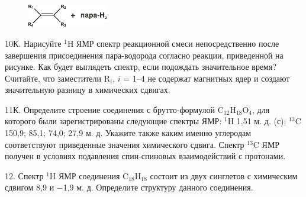 \begin{figure} %
    \centering
    \vspace{-3mm}
    \includegraphics[width=35mm]{images/Fig_2_9_10.png}
    \vspace{-4mm}
\end{figure}
10К. Нарисуйте $^1\text{H}$ ЯМР спектр реакционной смеси непосредственно после завершения присоединения пара-водорода согласно реакции, приведенной на рисунке. Как будет выглядеть спектр, если подождать значительное время? Считайте, что заместители $\text{R}_i$, $i$ = 1–4 не содержат магнитных ядер и создают значительную разницу в химических сдвигах.
\par
11К. Определите строение соединения с брутто-формулой $\text{C}_{12}\text{H}_{18}\text{O}_{4}$, для которого были зарегистрированы следующие спектры ЯМР: $^1\text{H}$ 1,51 м. д. (с); $^{13}\text{C}$ 150,9; 85,1; 74,0; 27,9 м. д. Укажите также каким именно углеродам соответствуют приведенные значения химического сдвига. Спектр $^{13}\text{C}$ ЯМР получен в условиях подавления спин-спиновых взаимодействий с протонами.
\par
12. Спектр $^1\text{H}$ ЯМР соединения $\text{C}_{18}\text{H}_{18}$ состоит из двух синглетов с химическим сдвигом 8,9 и $-$1,9 м. д. Определите структуру данного соединения.
\par
